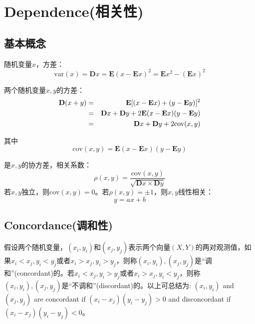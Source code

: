 \section{Dependence(相关性)}
\subsection{基本概念}
随机变量$x$，方差：
\begin{equation}
    \text{var}(x) = \mathbf{D}x = \mathbf{E}(x-\mathbf{E}x)^2 = \mathbf{E}x^2-(\mathbf{E}x)^2
    \label{eq-var}
\end{equation}

两个随机变量$x,y$的方差：
\begin{eqnarray}
    \mathbf{D}(x+y) &=& \mathbf{E}[(x-\mathbf{E}x) + (y-\mathbf{E}y)]^2 \notag \\
    &=&\mathbf{D}x+\mathbf{D}y+2\mathbf{E}(x-\mathbf{E}x)(y-\mathbf{E}y) \notag \\
    &=&\mathbf{D}x+\mathbf{D}y+2\text{cov}(x,y)
    \label{eq-cov-var}
\end{eqnarray}

其中
\begin{equation}
    \text{cov}(x,y) = \mathbf{E}(x-\mathbf{E}x) (y-\mathbf{E}y)
    \label{eq-covariation}
\end{equation}

是$x,y$的协方差，相关系数：
\begin{equation}
    \rho (x,y) = \dfrac{\text{cov}(x,y)}{\sqrt{\mathbf{D}x\times\mathbf{D}y}}
    \label{eq-coefficient}
\end{equation}
若$x,y$独立，则cov$(x,y) = 0$。若$\rho(x,y) = \pm 1$，则$x,y$线性相关：
\begin{equation*}
    y = ax+b
\end{equation*}


\subsection{Concordance(调和性)}
假设两个随机变量，$(x_i,y_i)$和$(x_j,y_j)$表示两个向量$(X,Y)$的两对观测值，如果$x_i<x_j,y_i<y_j$或者$x_i>x_j,y_i>y_j$，则称$(x_i,y_i),(x_j,y_j)$是``调和''(concordant)的。若$x_i<x_j,y_i>y_j$或者$x_i>x_j,y_i<y_j$，则称$(x_i,y_i),(x_j,y_j)$是``不调和''(discordant)的。以上可总结为:
$(x_i,y_i)$ and $(x_j,y_j)$ are concordant if $(x_i-x_j)(y_i-y_j)>0$ and disconcordant if $(x_i-x_j)(y_i-y_j)<0$。








